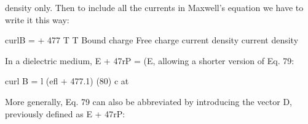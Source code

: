 density only. Then to include all the currents in Maxwell's equation
we have to write it this way:

\begin{equation}
\end{equation}
curlB =  + 477%
T T
Bound charge Free charge
current density current density

In a dielectric medium, E + 47rP = (E, allowing a shorter version
of Eq. 79:

\begin{equation}
\end{equation}
curl B = l (efl + 477.1) (80)
c at

More generally, Eq. 79 can also be abbreviated by introducing the
vector D, previously defined as E + 47rP:

\begin{equation}
\end{equation}
